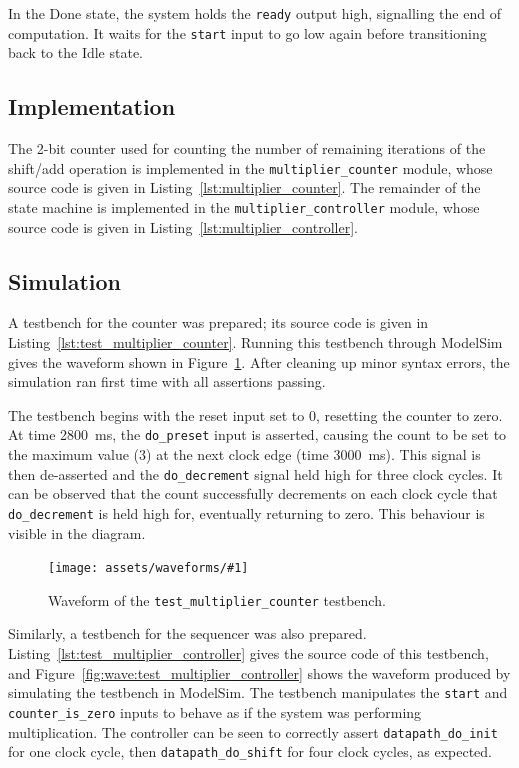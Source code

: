 \documentclass[a4paper]{article}
\newcommand{\waveformfigure}[2]{
  \begin{figure}[bp]
    \centering\texttt{[image: assets/waveforms/\#1]}
    \caption{#2}
    \label{fig:wave:#1}
  \end{figure}
}
\begin{document}
In the Done state, the system holds the \texttt{ready} output high, signalling the end of computation. It waits for the \texttt{start} input to go low again before transitioning back to the Idle state.

\subsection{Implementation}
\label{sec:seq:impl}

The 2-bit counter used for counting the number of remaining iterations of the shift/add operation is implemented in the \texttt{multiplier\_counter} module, whose source code is given in Listing~\ref{lst:multiplier_counter}. The remainder of the state machine is implemented in the \texttt{multiplier\_controller} module, whose source code is given in Listing~\ref{lst:multiplier_controller}.

\subsection{Simulation}
\label{sec:seq:sim}

A testbench for the counter was prepared; its source code is given in Listing~\ref{lst:test_multiplier_counter}. Running this testbench through ModelSim gives the waveform shown in Figure~\ref{fig:wave:test_multiplier_counter}. After cleaning up minor syntax errors, the simulation ran first time with all assertions passing.

The testbench begins with the reset input set to 0, resetting the counter to zero. At time \SI{2800}{\milli\second}, the \texttt{do\_preset} input is asserted, causing the count to be set to the maximum value (3) at the next clock edge (time \SI{3000}{\milli\second}). This signal is then de-asserted and the \texttt{do\_decrement} signal held high for three clock cycles. It can be observed that the count successfully decrements on each clock cycle that \texttt{do\_decrement} is held high for, eventually returning to zero. This behaviour is visible in the diagram.

\waveformfigure{test_multiplier_counter}{Waveform of the \texttt{test\_multiplier\_counter} testbench.}

Similarly, a testbench for the sequencer was also prepared. Listing~\ref{lst:test_multiplier_controller} gives the source code of this testbench, and Figure~\ref{fig:wave:test_multiplier_controller} shows the waveform produced by simulating the testbench in ModelSim. The testbench manipulates the \texttt{start} and \texttt{counter\_is\_zero} inputs to behave as if the system was performing multiplication. The controller can be seen to correctly assert \texttt{datapath\_do\_init} for one clock cycle, then \texttt{datapath\_do\_shift} for four clock cycles, as expected.
\end{document}
